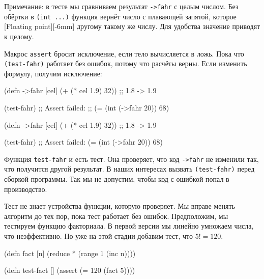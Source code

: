 Примечание: в тесте мы сравниваем результат \verb|->fahr| с целым числом. Без
обёртки в \verb|(int ...)| функция вернёт число с плавающей запятой, которое
[Floating point][-6mm]
другому такому же числу. Для удобства значение приводят к целому.

Макрос \verb|assert| бросит исключение, если тело вычисляется в ложь. Пока что
\verb|(test-fahr)| работает без ошибок, потому что расчёты верны. Если изменить
формулу, получим исключение:

\ifnarrow

\begin{english}
  \begin{clojure}
(defn ->fahr [cel]
  (+ (* cel 1.9) 32)) ;; 1.8 -> 1.9

(test-fahr)
;; Assert failed:
;; (= (int (->fahr 20)) 68)
  \end{clojure}
\end{english}

\else

\begin{english}
  \begin{clojure}
(defn ->fahr [cel]
  (+ (* cel 1.9) 32)) ;; 1.8 -> 1.9

(test-fahr)
;; Assert failed: (= (int (->fahr 20)) 68)
  \end{clojure}
\end{english}

\fi

Функция \verb|test-fahr| и есть тест. Она проверяет, что код \verb|->fahr|
не изменили так, что получится другой результат. В наших интересах вызвать
\verb|(test-fahr)| перед сборкой программы. Так мы не допустим, чтобы код с
ошибкой попал в производство.


Тест не знает устройства функции, которую проверяет. Мы вправе менять алгоритм
до тех пор, пока тест работает без ошибок. Предположим, мы тестируем функцию
факториала. В первой версии мы линейно умножаем числа, что неэффективно. Но уже
на этой стадии добавим тест, что $5! = 120$.

\begin{english}
  \begin{clojure}
(defn fact [n]
  (reduce * (range 1 (inc n))))

(defn test-fact []
  (assert (= 120 (fact 5))))
  \end{clojure}
\end{english}


